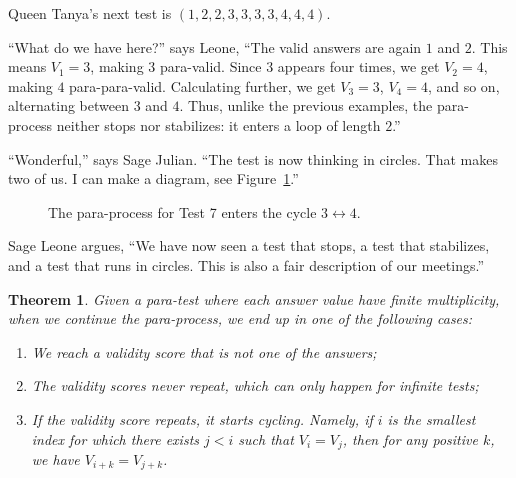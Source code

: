 \documentclass[12pt,reqno]{article}
\theoremstyle{plain}
\newtheorem{theorem}{Theorem}
\theoremstyle{definition}
\theoremstyle{remark}
\begin{document}
Queen Tanya's next test is $(1,2,2,3,3,3,3,4,4,4)$.

``What do we have here?'' says Leone, ``The valid answers are again $1$ and $2$. This means $V_1=3$, making $3$ para-valid. Since $3$ appears four times,
we get $V_2=4$, making $4$ para-para-valid. Calculating further, we get $V_3=3$, $V_4=4$, and so on, alternating between $3$ and $4$. Thus, unlike the previous examples, the para-process neither stops nor stabilizes: it enters a loop of length $2$.''

``Wonderful,'' says Sage Julian. ``The test is now thinking in circles. That makes two of us. I can make a diagram, see Figure~\ref{fig:test7-loop}.''

\begin{figure}[ht!] \centering {}
\caption{The para-process for Test 7 enters the cycle $3 \leftrightarrow 4$.} 
\label{fig:test7-loop} 
\end{figure}

Sage Leone argues, ``We have now seen a test that stops, a test that stabilizes, and a test that runs in circles. This is also a fair description of our meetings.''

\begin{theorem}
\label{thm:paracases}
    Given a para-test where each answer value have finite multiplicity, when we continue the para-process, we end up in one of the following cases:
    \begin{enumerate}
    \item We reach a validity score that is not one of the answers;
    \item The validity scores never repeat, which can only happen for infinite tests;
    \item If the validity score repeats, it starts cycling. Namely, if $i$ is the smallest index for which there exists $j < i$ such that $V_i = V_j$, then for any positive $k$, we have $V_{i+k} = V_{j+k}$.      
    \end{enumerate}
\end{theorem}
\end{document}
